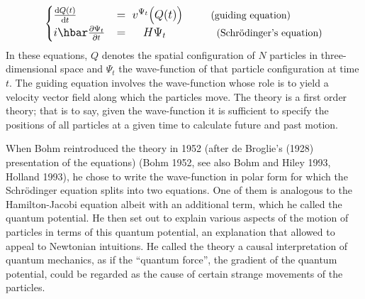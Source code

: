 \documentclass[12pt]{article}
\theoremstyle{definition}
\begin{document}
\begin{align*}
\large
\begin{cases} \frac{\mathrm{d} Q(t)}{\mathrm{d}t} &= \; v^{\Psi_t}\bigl(Q(t)\bigr) \hspace*{1cm} \text{\normalsize (guiding equation)}\\
i \hbar \frac{\partial \Psi_t}{\partial t} & = \hspace*{.5cm} H \Psi_t \hspace*{1.8cm} \text{\normalsize (Schr\"odinger's equation)}
\end{cases}
\end{align*}
In these equations, $Q$ denotes the spatial configuration of $N$ particles in three-dimensional space and $\Psi_t$ the wave-function of that particle configuration at time $t$. The guiding equation involves the wave-function whose role is to yield a velocity vector field along which the particles move. The theory is a first order theory; that is to say, given the wave-function it is sufficient to specify the positions of all particles at a given time to calculate future and past motion.

When Bohm reintroduced the theory in 1952 (after de Broglie's (1928) presentation of the equations) (Bohm 1952, see also Bohm and Hiley 1993, Holland 1993), he chose to write the wave-function in polar form for which the Schr\"odinger equation splits into two equations. One of them is analogous to the Hamilton-Jacobi equation albeit with an additional term, which he called the quantum potential. He then set out to explain various aspects of the motion of particles in terms of this quantum potential, an explanation that allowed to appeal to Newtonian intuitions. He called the theory a causal interpretation of quantum mechanics, as if the ``quantum force'', the gradient of the quantum potential, could be regarded as the cause of certain strange movements of the particles.
\end{document}
